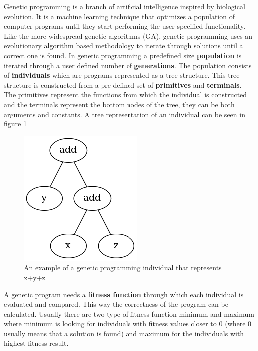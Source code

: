 Genetic programming is a branch of artificial intelligence inspired by biological evolution. It is a machine learning
technique that optimizes a population of computer programs until they start performing the user specified
functionality. Like the more widespread genetic algorithms (GA), genetic programming uses an evolutionary algorithm
based methodology to iterate through solutions until a correct one is found. In genetic programming a 
predefined size \textbf{population} is iterated through a user defined number of \textbf{generations}. 
The population consists of \textbf{individuals} which are programs represented as a tree structure.
This tree structure is constructed from a pre-defined set of \textbf{primitives} and \textbf{terminals}.
The primitives represent the functions from which the individual is constructed and
the terminals represent the bottom nodes of the tree, they can be both arguments and constants. A tree representation of an individual
can be seen in figure \ref{fig:ind}
\begin{figure}[htp]
\centering
\includegraphics[scale=0.6]{Figures/ind.png}
\caption{An example of a genetic programming individual that represents x+y+z}
\label{fig:ind}
\end{figure}
A genetic program needs a \textbf{fitness function} through which each individual
is evaluated and compared. This way the correctness of the program can be calculated. Usually there are two type of fitness function 
minimum and maximum where minimum is looking for individuals with fitness values closer to 0 (where 0 usually means that a solution is found)
and maximum for the individuals with highest fitness result.
